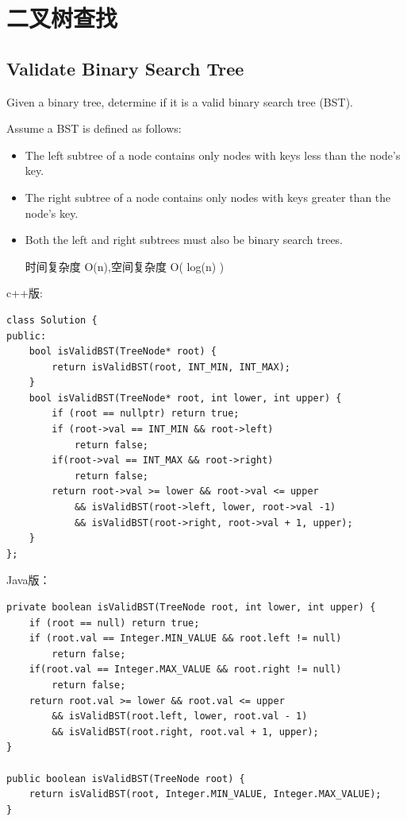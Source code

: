 \documentclass[12pt]{book}
\begin{document}
\section{二叉树查找}
\label{sec-4-4}

\subsection{Validate Binary Search Tree}
\label{sec-4-4-1}
Given a binary tree, determine if it is a valid binary search tree (BST).

Assume a BST is defined as follows:
\begin{itemize}
\item The left subtree of a node contains only nodes with keys less than the node's key.
\item The right subtree of a node contains only nodes with keys greater than the node's key.
\item Both the left and right subtrees must also be binary search trees.

时间复杂度 O(n),空间复杂度 O( log(n) )
\end{itemize}

c++版:
\lstset{language=java,label= ,caption= ,numbers=none}
\begin{lstlisting}
class Solution {
public:
    bool isValidBST(TreeNode* root) {
        return isValidBST(root, INT_MIN, INT_MAX);
    }
    bool isValidBST(TreeNode* root, int lower, int upper) {
        if (root == nullptr) return true;
        if (root->val == INT_MIN && root->left)
            return false;
        if(root->val == INT_MAX && root->right)
            return false;
        return root->val >= lower && root->val <= upper
            && isValidBST(root->left, lower, root->val -1)
            && isValidBST(root->right, root->val + 1, upper);
    }
};
\end{lstlisting}

Java版：
\lstset{language=java,label= ,caption= ,numbers=none}
\begin{lstlisting}
private boolean isValidBST(TreeNode root, int lower, int upper) {
    if (root == null) return true;
    if (root.val == Integer.MIN_VALUE && root.left != null)
        return false;
    if(root.val == Integer.MAX_VALUE && root.right != null)
        return false;
    return root.val >= lower && root.val <= upper
        && isValidBST(root.left, lower, root.val - 1)
        && isValidBST(root.right, root.val + 1, upper);
}
        
public boolean isValidBST(TreeNode root) {
    return isValidBST(root, Integer.MIN_VALUE, Integer.MAX_VALUE);
}
\end{lstlisting}
\end{document}
